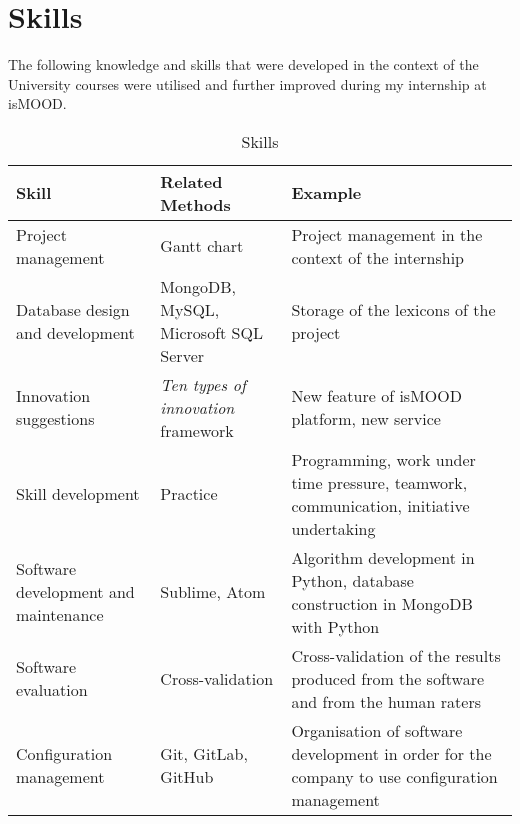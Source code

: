 \section{Skills}
\label{sec:skills}

The following knowledge and skills that were developed
in the context of the University courses were utilised
and further improved during my internship at isMOOD.

\begin{table}[ht]
\caption{\label{tab:skills}Skills}
\begin{tabularx}{\textwidth}{|X|X|X|}
 \hline
 \textbf{Skill} & \textbf{Related Methods} & \textbf{Example} \\ 
 \hline
 Project management & Gantt chart & Project management in the context of the internship \\
 \hline
 Database design and development & MongoDB, MySQL, Microsoft SQL Server & Storage of the lexicons of the project \\ 
 \hline
 Innovation suggestions & \emph{Ten types of innovation} framework & New feature of isMOOD platform, new service \\ 
 \hline
 Skill development & Practice & Programming, work under time pressure, teamwork, communication, initiative undertaking \\
 \hline
 Software development and maintenance & Sublime, Atom & Algorithm development in Python, database construction in MongoDB with Python \\
 \hline
 Software evaluation & Cross-validation & Cross-validation of the results produced from the software and from the human raters \\
 \hline
 Configuration management & Git, GitLab, GitHub & Organisation of software development in order for the company to use configuration management \\
 \hline
\end{tabularx}
\end{table}
